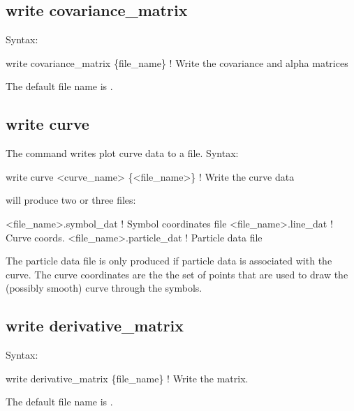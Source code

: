 {{{{{{{{{{{\subsection{write covariance_matrix}
\label{s:write.covar.matrix}

Syntax:
\begin{example}
    write covariance_matrix \{file_name\}    ! Write the covariance and alpha matrices 
\end{example}

The default file name is .


\subsection{write curve}
\label{s:write.curve}

The  command writes plot curve data to a file.
Syntax:
\begin{example}
    write curve <curve_name> \{<file_name>\} ! Write the curve data
\end{example}

 will produce two or three files:
\begin{example}
  <file_name>.symbol_dat    ! Symbol coordinates file
  <file_name>.line_dat      ! Curve coords.
  <file_name>.particle_dat  ! Particle data file
\end{example}
The particle data file is only produced if particle data is associated with the curve.  The curve
coordinates are the the set of points that are used to draw the (possibly smooth) curve through the
symbols.



\subsection{write derivative_matrix}
\label{s:write.deriv.matrix}

Syntax:
\begin{example}
    write derivative_matrix \{file_name\}    ! Write the  matrix.
\end{example}

The default file name is . 


}}}}}}}}}}}
